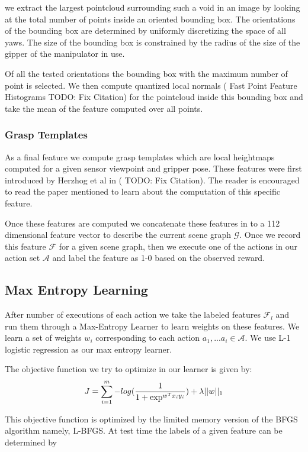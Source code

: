 we extract the largest pointcloud surrounding such a void in an image by looking at the total number of points inside an oriented bounding box. The orientations of the bounding box are determined by uniformly discretizing the space of all yaws. The size of the bounding box is constrained by the radius of the size of the gipper of the manipulator in use.

Of all the tested orientations the bounding box with the maximum number of point is selected. We then compute quantized local normals ( Fast Point Feature Histograms \cite{Javidi12_Journal} TODO: Fix Citation) for the pointcloud inside this bounding box and take the mean of the feature computed over all points.

\subsubsection{Grasp Templates}
As a final feature we compute grasp templates which are local heightmaps computed for a given sensor viewpoint and gripper pose. These features were first introduced by Herzhog et al in (\cite{Javidi12_Journal} TODO: Fix Citation). The reader is encouraged to read the paper mentioned to learn about the computation of this specific feature.

Once these features are computed we concatenate these features in to a 112 dimensional feature vector to describe the current scene graph $\mathcal{G}$. Once we record this feature $\mathcal{F}$ for a given scene graph, then we execute one of the actions in our action set $\mathcal{A}$ and label the feature as 1-0 based on the observed reward.

\subsection{Max Entropy Learning}
After number of executions of each action we take the labeled features $\mathcal{F}_l$ and run them through a Max-Entropy Learner to learn weights on these features. We learn a set of weights $w_i$ corresponding to each action ${a_1,...a_i}\in \mathcal{A}$. We use L-1 logistic regression as our max entropy learner.

The objective function we try to optimize in our learner is given by:
\[
J = \sum_{i=1}^m-log(\frac{1}{1+\exp^{w^Tx_iy_i}}) + \lambda||w||_1\\
\]

This objective function is optimized by the limited memory version of the BFGS algorithm namely, L-BFGS. At test time the labels of a given feature can be determined by 

